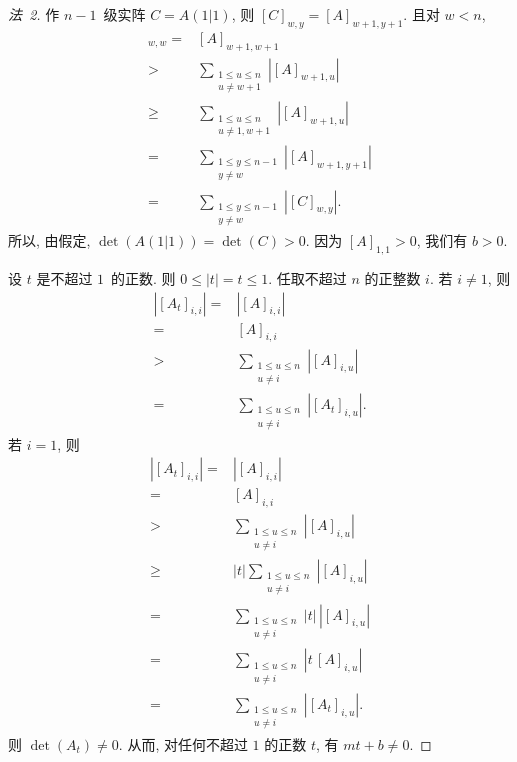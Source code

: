 \begin{proof}[法~2]
    作 \(n-1\)~级实阵 \(C = A(1 | 1)\),
    则 \([C]_{w,y} = [A]_{w+1,y+1}\).
    且对 \(w < n\),
    \begin{align*}
        [C]_{w,w}
        = {}    &
        [A]_{w+1,w+1}
        \\
        > {}    &
        \sum_{\substack{1 \leq u \leq n   \\u \neq w+1}}
        {|[A]_{w+1,u}|}
        \\
        \geq {} &
        \sum_{\substack{1 \leq u \leq n   \\u \neq 1, w+1}}
        {|[A]_{w+1,u}|}
        \\
        = {}    &
        \sum_{\substack{1 \leq y \leq n-1 \\y \neq w}}
        {|[A]_{w+1,y+1}|}
        \\
        = {}    &
        \sum_{\substack{1 \leq y \leq n-1 \\y \neq w}}
        {|[C]_{w,y}|}.
    \end{align*}
    所以, 由假定, \(\det {(A(1|1))} = \det {(C)} > 0\).
    因为 \([A]_{1,1} > 0\), 我们有 \(b > 0\).

    设 \(t\) 是不超过 \(1\)~的正数.
    则 \(0 \leq |t| = t \leq 1\).
    任取不超过 \(n\) 的正整数 \(i\).
    若 \(i \neq 1\), 则
    \begin{align*}
        |[A_t]_{i,i}|
        = {} &
        |[A]_{i,i}|
        \\
        = {} &
        [A]_{i,i}
        \\
        > {} &
        \sum_{\substack{1 \leq u \leq n \\u \neq i}}
        {|[A]_{i,u}|}
        \\
        = {} &
        \sum_{\substack{1 \leq u \leq n \\u \neq i}}
        {|[A_t]_{i,u}|}.
    \end{align*}
    若 \(i = 1\), 则
    \begin{align*}
        |[A_t]_{i,i}|
        = {}    &
        |[A]_{i,i}|
        \\
        = {}    &
        [A]_{i,i}
        \\
        > {}    &
        \sum_{\substack{1 \leq u \leq n     \\u \neq i}}
        {|[A]_{i,u}|}
        \\
        \geq {} &
        |t| \sum_{\substack{1 \leq u \leq n \\u \neq i}}
        {|[A]_{i,u}|}
        \\
        = {}    &
        \sum_{\substack{1 \leq u \leq n     \\u \neq i}}
        {|t|\, |[A]_{i,u}|}
        \\
        = {}    &
        \sum_{\substack{1 \leq u \leq n     \\u \neq i}}
        {|t\, [A]_{i,u}|}
        \\
        = {}    &
        \sum_{\substack{1 \leq u \leq n     \\u \neq i}}
        {|[A_t]_{i,u}|}.
    \end{align*}
    则 \(\det {(A_t)} \neq 0\).
    从而,
    对任何不超过 \(1\) 的正数 \(t\),
    有 \(mt + b \neq 0\).


\end{proof}
